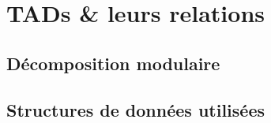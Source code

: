 \section{TADs \& leurs relations}
\subsection{Décomposition modulaire}

\bframes{
  
}

\bframes{
 
}

\bframes{
    
}


%

\subsection{Structures de données utilisées}

%
%
